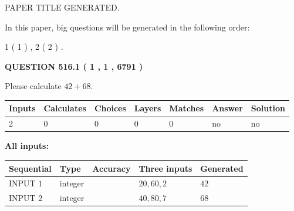 \documentclass[12pt]{article}
\begin{document}
   
\vspace{0.2in}
   
   
   
   
   
   
   
   
 \vspace{0.2in}
 
 
 
 
   
   
 PAPER TITLE GENERATED.
   
   
   
\vspace{0.2in}
   
In this paper, big questions will be generated in the following order: 
   
   
   1 ( 1 )
 ,
   2 ( 2 )
 .
  
\vspace{0.2in}
  
{\textbf{\Large{QUESTION
516.1 
 ( 1 , 1 , 6791 )
}}}
  
  
 
Please calculate $ %
42 +  %
68 $.
 
 
   
   
   
   
\noindent\begin{tabular}{|l|l|l|l|l|l|l|}
 \hline
Inputs & Calculates & Choices & Layers & Matches & Answer & Solution \\ \hline
 2  & 
 0  & 
 0
  & 
 0  & 
 0  & 
  no & 
  no 
  \\ \hline
 \end{tabular}
   
   
   
   
\noindent{}
   
   
   
   
\noindent\vspace{0.1in}\hspace{-0.08in} {\textbf{\Large{All inputs: }}}
   
   
  
  
\noindent\begin{tabular}{|l|l|l|l|l|}
\hline
 Sequential & Type & Accuracy & Three inputs & Generated \\ 
\hline
 
 
  INPUT $  1 $ & integer &  & $
 20
 , 
 60
 , 
 2
 $ & $ 42 $ 
 \\  \hline  
 
 
  INPUT $  2 $ & integer &  & $
 40
 , 
 80
 , 
 7
 $ & $ 68 $ 
 \\  \hline  
 \end{tabular}
   
\end{document}
